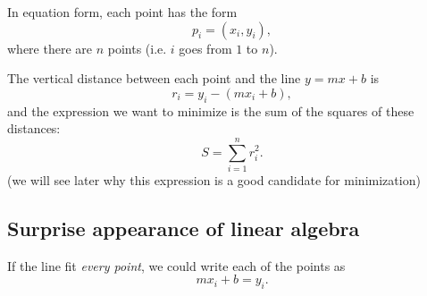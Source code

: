 \documentclass{article}
\begin{document}
%
%

In equation form, each point has the form
\begin{equation}
	p_{i} = \left(x_{i}, y_{i}\right),
	\label{eq:point_form}
\end{equation}
where there are $n$ points (i.e. $i$ goes from $1$ to $n$).

The vertical distance between each point and the line $y=mx+b$ is
\begin{equation}
	r_{i} = y_{i} - \left(mx_{i}+b\right),
	\label{eq:distance_point_line_best_fit}
\end{equation}
and the expression we want to minimize is the sum of the squares of these distances:
\begin{equation}
	S = \sum\limits_{i=1}^{n}r_{i}^{2}.
	\label{eq:sum_to_minimize}
\end{equation}
(we will see later why this expression is a good candidate for minimization)

\subsection{Surprise appearance of linear algebra}
If the line fit \textit{every point}, we could write each of the points as
\begin{equation}
	mx_{i} + b = y_{i}.
	\label{eq:perfect_fit_expression}
\end{equation}
\end{document}
